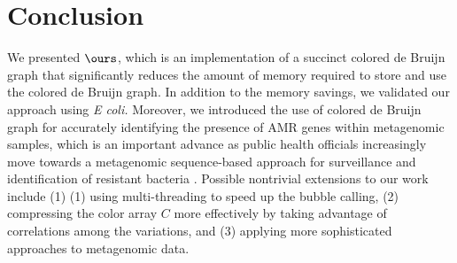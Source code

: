 \section{Conclusion}
\label{p3-sec:conclusion}

We presented $\ours$, which is an implementation of a succinct colored de Bruijn graph that significantly reduces the amount of memory required to store and use the colored de Bruijn graph. In addition to the memory savings, we validated our approach using {\em E coli.} Moreover, we introduced the use of colored de Bruijn graph for accurately identifying the presence of AMR genes within metagenomic samples, which is an important advance as public health officials increasingly move towards a metagenomic sequence-based approach for surveillance and identification of resistant bacteria \cite{baquero_metagenomic_epi, port_2014_metagenomics_AMR_monitoring,FAOActionPlan2016}. Possible nontrivial extensions to our work include (1)
(1) using multi-threading to speed up the bubble calling, (2) compressing the color array $C$ more effectively by taking advantage of correlations among the variations, and (3) applying more sophisticated approaches to metagenomic data.





